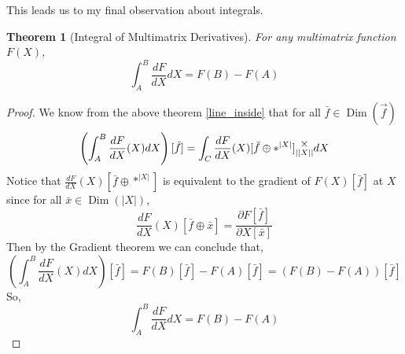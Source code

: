 \documentclass[12pt]{book}
\theoremstyle{plain}
\newtheorem{theorem}{Theorem}[chapter]
\theoremstyle{definition}
\theoremstyle{ppart}
\theoremstyle{case}
\theoremstyle{solution}
\DeclareMathOperator{\Dim}{Dim}
\newcommand{\mmult}[1]{\text{\raisebox{1ex}{$\underset{#1}{\times}$}}}
\newcommand{\shape}[1]{\left|#1\right|}
\begin{document}
This leads us to my final observation about integrals. 

\begin{theorem}[Integral of Multimatrix Derivatives]
For any multimatrix function $F(X)$,
\[ \int_A^B \frac{dF}{dX} dX = F(B) - F(A) \]
\end{theorem}
\begin{proof}
We know from the above theorem \ref{line_inside} that for all $\bar{f} \in \Dim(\vec{f})$
\[ \left(\int_A^B \frac{dF}{dX}(X) dX\right)[\bar{f}] = \int_C \frac{dF}{dX}(X)[\bar{f} \oplus *^{\shape{X}}] \mmult{\shape{\shape{X}}} dX \]
Notice that $\frac{dF}{dX}(X)[\bar{f} \oplus *^{\shape{X}}]$ is equivalent
to the gradient of $F(X)[\bar{f}]$ at $X$ since for all $\bar{x} \in \Dim(\shape{X})$,
\[ \frac{dF}{dX}(X)[\bar{f} \oplus \bar{x}] = \frac{\partial F[\bar{f}]}{\partial X[\bar{x}]} \]
Then by the Gradient theorem \cite{wiki:gradient_thm} we can conclude that,
\[ \left(\int_A^B \frac{dF}{dX}(X) dX\right)[\bar{f}] =  F(B)[\bar{f}] - F(A)[\bar{f}] = \left( F(B)-F(A) \right)[\bar{f}] \]
So, 
\[ \int_A^B \frac{dF}{dX} dX = F(B) - F(A) \]
\end{proof}
\end{document}
